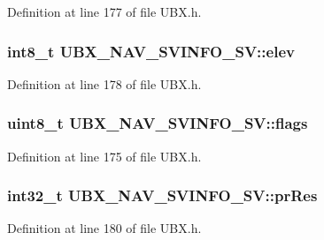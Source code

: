 \-Definition at line 177 of file \-U\-B\-X.\-h.

\hypertarget{struct_u_b_x___n_a_v___s_v_i_n_f_o___s_v_a8fad57e044674c92508262141a99a154}{
\subsubsection[{elev}]{\setlength{\rightskip}{0pt plus 5cm}int8\-\_\-t {\bf \-U\-B\-X\-\_\-\-N\-A\-V\-\_\-\-S\-V\-I\-N\-F\-O\-\_\-\-S\-V\-::elev}}}\label{struct_u_b_x___n_a_v___s_v_i_n_f_o___s_v_a8fad57e044674c92508262141a99a154}


\-Definition at line 178 of file \-U\-B\-X.\-h.

\hypertarget{struct_u_b_x___n_a_v___s_v_i_n_f_o___s_v_ae645c4ae01edd4d7c5dffca7eb094aa3}{
\subsubsection[{flags}]{\setlength{\rightskip}{0pt plus 5cm}uint8\-\_\-t {\bf \-U\-B\-X\-\_\-\-N\-A\-V\-\_\-\-S\-V\-I\-N\-F\-O\-\_\-\-S\-V\-::flags}}}\label{struct_u_b_x___n_a_v___s_v_i_n_f_o___s_v_ae645c4ae01edd4d7c5dffca7eb094aa3}


\-Definition at line 175 of file \-U\-B\-X.\-h.

\hypertarget{struct_u_b_x___n_a_v___s_v_i_n_f_o___s_v_adf2342e560319acf1b48051a49463b09}{
\subsubsection[{pr\-Res}]{\setlength{\rightskip}{0pt plus 5cm}int32\-\_\-t {\bf \-U\-B\-X\-\_\-\-N\-A\-V\-\_\-\-S\-V\-I\-N\-F\-O\-\_\-\-S\-V\-::pr\-Res}}}\label{struct_u_b_x___n_a_v___s_v_i_n_f_o___s_v_adf2342e560319acf1b48051a49463b09}


\-Definition at line 180 of file \-U\-B\-X.\-h.

